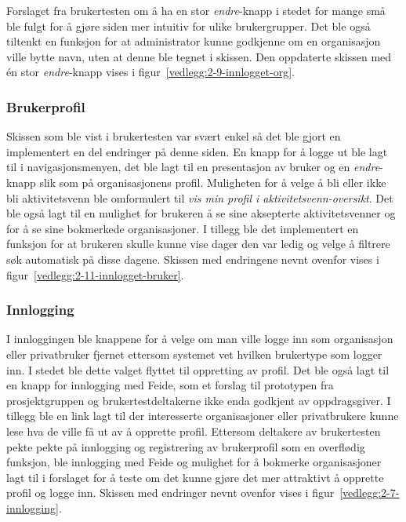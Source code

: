 Forslaget fra brukertesten om å ha en stor {\em  endre}-knapp i stedet for mange små ble fulgt for å gjøre siden mer intuitiv for ulike brukergrupper. Det ble også tiltenkt en funksjon for at administrator kunne godkjenne om en organisasjon ville bytte navn, uten at denne ble tegnet i skissen. Den oppdaterte skissen med én stor {\em  endre}-knapp vises i figur~\ref{vedlegg:2-9-innlogget-org}.

\subsubsection{Brukerprofil}
 
Skissen som ble vist i brukertesten var svært enkel så det ble gjort en implementert en del endringer på denne siden. En knapp for å logge ut ble lagt til i navigasjonsmenyen, det ble lagt til en presentasjon av bruker og en {\em  endre}-knapp slik som på organisasjonens profil. Muligheten for å velge å bli eller ikke bli aktivitetsvenn ble omformulert til {\em  vis min profil i aktivitetsvenn-oversikt}. Det ble også lagt til en mulighet for brukeren å se sine aksepterte aktivitetsvenner og for å se sine bokmerkede organisasjoner. I tillegg ble det implementert en funksjon for at brukeren skulle kunne vise dager den var ledig og velge å filtrere søk automatisk på disse dagene. Skissen med endringene nevnt ovenfor vises i figur~\ref{vedlegg:2-11-innlogget-bruker}.

\subsubsection{Innlogging}
 I innloggingen ble knappene for å velge om man ville logge inn som organisasjon eller privatbruker fjernet ettersom systemet vet hvilken brukertype som logger inn. I stedet ble dette valget flyttet til oppretting av profil. Det ble også lagt til en knapp for innlogging med Feide, som et forslag til prototypen fra prosjektgruppen og brukertestdeltakerne ikke enda godkjent av oppdragsgiver. I tillegg ble en link lagt til der interesserte organisasjoner eller privatbrukere kunne lese hva de ville få ut av å opprette profil. Ettersom deltakere av brukertesten pekte pekte på innlogging og registrering av brukerprofil som en overflødig funksjon, ble innlogging med Feide og mulighet for å bokmerke organisasjoner lagt til i forslaget for å teste om det kunne gjøre det mer attraktivt å opprette profil og logge inn. Skissen med endringer nevnt ovenfor vises i figur~\ref{vedlegg:2-7-innlogging}.

